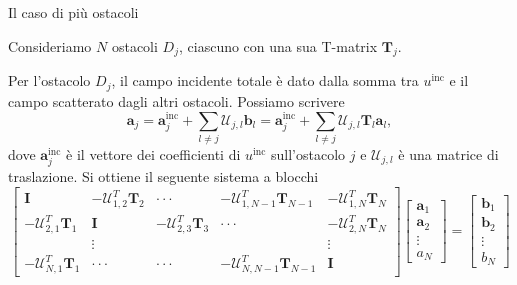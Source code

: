 \documentclass{beamer}
\newcommand{\inc}{{\mathrm{inc}}}
\begin{document}
	\begin{frame}{Il caso di più ostacoli}
		\begin{small}
		Consideriamo $N$ ostacoli $D_j$, ciascuno con una sua T-matrix $\mathbf{T}_j$. 
		
		Per l'ostacolo $D_j$, il campo incidente totale è dato dalla somma tra $u^\inc$ e il campo scatterato dagli altri ostacoli. Possiamo scrivere
		\begin{equation*}
			\mathbf{a}_j = \mathbf{a}_j^\inc + \sum_{l \neq j} \mathcal{U}_{j,l} \mathbf{b}_l = \mathbf{a}_j^\inc + \sum_{l \neq j} \mathcal{U}_{j,l} \mathbf{T}_l \mathbf{a}_l,
		\end{equation*}
		dove $\mathbf{a}_j^\inc$ è il vettore dei coefficienti di $u^\inc$ sull'ostacolo $j$ e $\mathcal{U}_{j,l}$ è una matrice di traslazione. Si ottiene il seguente sistema a blocchi
		\begin{equation*}
			\left[\begin{matrix}
				\mathbf{I} & -\mathcal{U}_{1,2}^T \mathbf{T}_2 & \cdot\cdot\cdot & -\mathcal{U}_{1,N-1}^T \mathbf{T}_{N-1} & -\mathcal{U}_{1,N}^T \mathbf{T}_N\\
				-\mathcal{U}_{2,1}^T \mathbf{T}_1 & \mathbf{I} & -\mathcal{U}_{2,3}^T \mathbf{T}_3 & \cdot\cdot\cdot & -\mathcal{U}_{2,N}^T \mathbf{T}_N \\
				 & \vdots & & & \vdots \\
				-\mathcal{U}_{N,1}^T \mathbf{T}_1 & \cdot\cdot\cdot & \cdot\cdot\cdot & -\mathcal{U}_{N,N-1}^T \mathbf{T}_{N-1} & \mathbf{I}
			\end{matrix}\right] \left[ \begin{matrix}
			\mathbf{a}_1 \\ \mathbf{a}_2 \\ \vdots \\ a_N
			\end{matrix} \right] = \left[ \begin{matrix}
			\mathbf{b}_1 \\ \mathbf{b}_2 \\ \vdots \\ b_N
			\end{matrix} \right]
		\end{equation*}
		\end{small}
	\end{frame}
	
\end{document}
